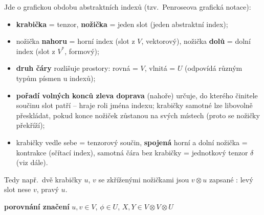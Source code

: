 \begin{vysvetleni}
Jde o grafickou obdobu abstraktních indexů (tzv.\ Penroseova grafická notace):
\begin{itemize}[nosep,leftmargin=1.2em]
  \item \textbf{krabička} = tenzor, \textbf{nožička} = jeden slot (jeden abstraktní index);
  \item nožička \textbf{nahoru} = horní index (slot z $V$, vektorový), nožička \textbf{dolů} = dolní index (slot z $V^*$, formový);
  \item \textbf{druh čáry} rozlišuje prostory: rovná = $V$, vlnitá = $U$ (odpovídá různým typům písmen u indexů);
  \item \textbf{pořadí volných konců zleva doprava} (nahoře) určuje, do kterého činitele součinu slot patří -- hraje roli jména indexu; krabičky samotné lze libovolně přeskládat, pokud konce nožiček zůstanou na svých místech (proto se nožičky překříží);
  \item krabičky vedle sebe = tenzorový součin, \textbf{spojená} horní a dolní nožička = kontrakce (sčítací index), samotná čára bez krabičky = jednotkový tenzor $\delta$ (viz dále).
\end{itemize}
Tedy např.\ dvě krabičky $u$, $v$ se zkříženými nožičkami jsou $v\otimes u$ zapsané : levý slot nese $v$, pravý $u$.
\end{vysvetleni}

\shorthandoff{-}%
\providecommand{\gmIpetX}[2]{\tikz[baseline=(gx.base),line width=0.5pt]{%
    \node[draw,inner sep=1.2pt,minimum width=1.2em,minimum height=1.1em] (gx) at (0,0) {$\scriptstyle #1$};
    \node[draw,inner sep=1.2pt,minimum width=1.2em,minimum height=1.1em] (gy) at (1.8em,0) {$\scriptstyle #2$};
    \draw (gx.north) -- ++(0.9em,0.7em) -- ++(0.9em,0.25em);
    \draw (gy.north) -- ++(-0.9em,0.7em) -- ++(-0.9em,0.25em);}}
\shorthandon{-}%

\textbf{porovnání značení} \qquad $u, v\in V$, \quad $\phi\in U$, \qquad $X, Y\in V\otimes V\otimes U$

